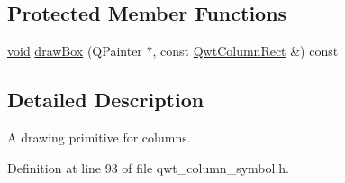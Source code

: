 \subsection*{Protected Member Functions}
\begin{DoxyCompactItemize}
\item 
\hyperlink{group___u_a_v_objects_plugin_ga444cf2ff3f0ecbe028adce838d373f5c}{void} \hyperlink{class_qwt_column_symbol_a7f7951e3c38927c25f21dd8c3d47372a}{draw\-Box} (Q\-Painter $\ast$, const \hyperlink{class_qwt_column_rect}{Qwt\-Column\-Rect} \&) const 
\end{DoxyCompactItemize}


\subsection{Detailed Description}
A drawing primitive for columns. 

Definition at line 93 of file qwt\-\_\-column\-\_\-symbol.\-h.



